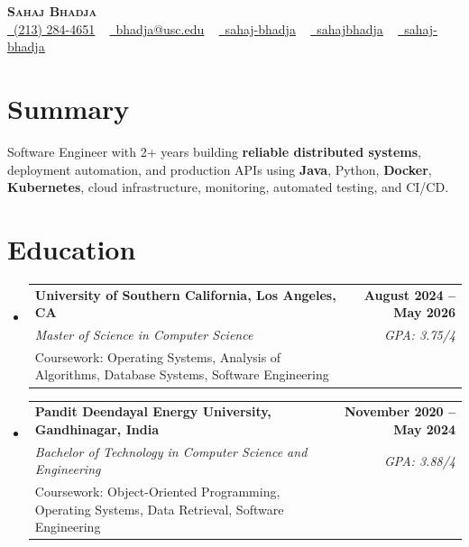 \documentclass[letterpaper,10pt]{article}
\makeatletter
\newcommand{\sectionGap}{\vspace{-8pt}}
\newcommand{\resumeEduSubheading}[5]{\vspace{-1pt}\item\begin{tabular*}{1.0\textwidth}[t]{l@{\extracolsep{\fill}}r}\textbf{#1} & \textbf{\small #2} \\\textit{\small #3} & \textit{\small #4} \\\small #5 & \\\end{tabular*}\vspace{-4pt}}
\newcommand{\resumeSubHeadingListStart}{\begin{itemize}[leftmargin=0.0in, label={}]}
\newcommand{\resumeSubHeadingListEnd}{\end{itemize}}
\makeatother
\begin{document}
\begin{center}
{\Huge \scshape \textbf{Sahaj Bhadja}} \\ \vspace{1pt}
\small \href{tel:2132844651}{\faPhone\ \underline{(213) 284-4651}} ~ \href{mailto:bhadja@usc.edu}{\raisebox{-0.2\height}\faEnvelope\ \underline{bhadja@usc.edu}} ~
\href{https://www.linkedin.com/in/sahaj-bhadja/}{\raisebox{-0.2\height}\faLinkedin\ \underline{sahaj-bhadja}} ~ \href{https://github.com/SAHAJ-BHADJA}{\raisebox{-0.2\height}\faGithub\ \underline{sahajbhadja}} ~
\href{https://sahaj-bhadja.vercel.app/}{\raisebox{-0.2\height}\faGlobe\ \underline{sahaj-bhadja}}
\end{center}
\vspace{-16pt}
\section{Summary}
\begin{itemize}[leftmargin=0.15in, label={}]
\small{\item{Software Engineer with 2+ years building \textbf{reliable distributed systems}, deployment automation, and production APIs using \textbf{Java}, Python, \textbf{Docker}, \textbf{Kubernetes}, cloud infrastructure, monitoring, automated testing, and CI/CD.}}
\end{itemize}
\sectionGap
\section{Education}
\resumeSubHeadingListStart
\resumeEduSubheading{University of Southern California, Los Angeles, CA}{August 2024 -- May 2026}{Master of Science in Computer Science}{GPA: 3.75/4}{Coursework: Operating Systems, Analysis of Algorithms, Database Systems, Software Engineering}
\resumeEduSubheading{Pandit Deendayal Energy University, Gandhinagar, India}{November 2020 -- May 2024}{Bachelor of Technology in Computer Science and Engineering}{GPA: 3.88/4}{Coursework: Object-Oriented Programming, Operating Systems, Data Retrieval, Software Engineering}
\resumeSubHeadingListEnd
\sectionGap
\end{document}
